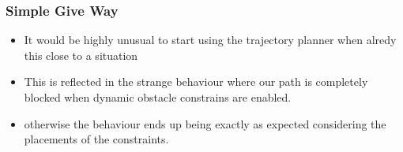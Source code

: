\subsubsection{Simple Give Way}
\begin{itemize}
    \item It would be highly unusual to start using the trajectory planner when alredy this close to a situation
    \item This is reflected in the strange behaviour where our path is completely blocked when dynamic obstacle constrains are enabled.
    \item otherwise the behaviour ends up being exactly as expected considering the placements of the constraints.
\end{itemize}
\clearpage
